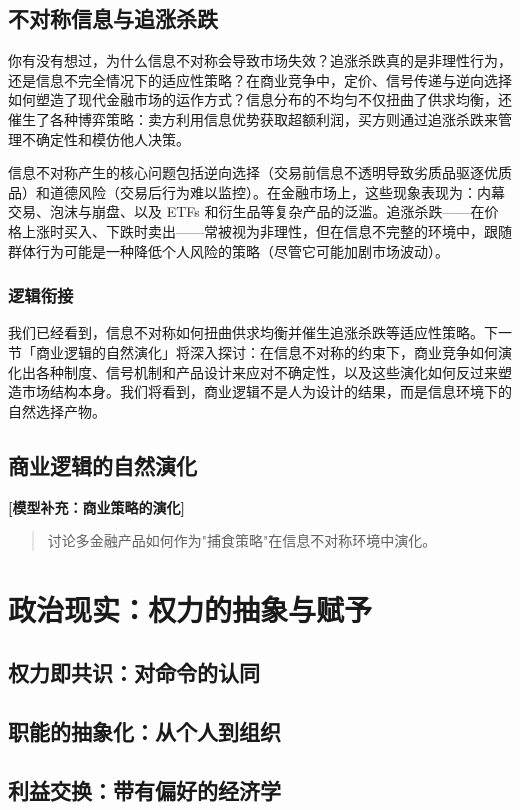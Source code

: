 \documentclass[openany]{book} %
\newenvironment{derivation}[1][数学推导与模型细节]{
	\par\vspace{1em}\noindent\textbf{\color{darkgray} [#1]} \itshape \small
	\begin{quote}\color{gray}
	}{
	\end{quote}\par\vspace{1em}
}
\begin{document}
	\section{不对称信息与追涨杀跌}

你有没有想过，为什么信息不对称会导致市场失效？追涨杀跌真的是非理性行为，还是信息不完全情况下的适应性策略？在商业竞争中，定价、信号传递与逆向选择如何塑造了现代金融市场的运作方式？信息分布的不均匀不仅扭曲了供求均衡，还催生了各种博弈策略：卖方利用信息优势获取超额利润，买方则通过追涨杀跌来管理不确定性和模仿他人决策。

信息不对称产生的核心问题包括逆向选择（交易前信息不透明导致劣质品驱逐优质品）和道德风险（交易后行为难以监控）。在金融市场上，这些现象表现为：内幕交易、泡沫与崩盘、以及 ETFs 和衍生品等复杂产品的泛滥。追涨杀跌——在价格上涨时买入、下跌时卖出——常被视为非理性，但在信息不完整的环境中，跟随群体行为可能是一种降低个人风险的策略（尽管它可能加剧市场波动）。

\subsection{逻辑衔接}
我们已经看到，信息不对称如何扭曲供求均衡并催生追涨杀跌等适应性策略。下一节「商业逻辑的自然演化」将深入探讨：在信息不对称的约束下，商业竞争如何演化出各种制度、信号机制和产品设计来应对不确定性，以及这些演化如何反过来塑造市场结构本身。我们将看到，商业逻辑不是人为设计的结果，而是信息环境下的自然选择产物。

	\section{商业逻辑的自然演化}
	\begin{derivation}[模型补充：商业策略的演化]
		讨论多金融产品如何作为"捕食策略"在信息不对称环境中演化。
	\end{derivation}

	\chapter{政治现实：权力的抽象与赋予}
	\section{权力即共识：对命令的认同}
	\section{职能的抽象化：从个人到组织}
	\section{利益交换：带有偏好的经济学}
\end{document}
